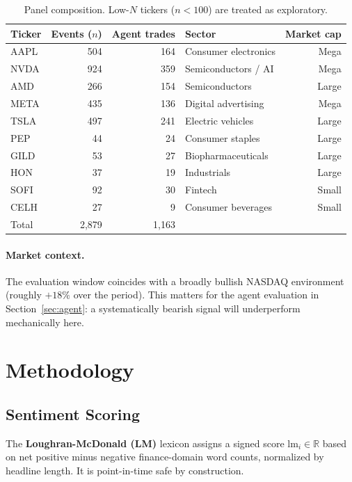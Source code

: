 \documentclass[11pt, letterpaper]{article}
\begin{document}
\begin{table}[h]
\centering
\small
\caption{Panel composition. Low-$N$ tickers ($n < 100$) are treated as exploratory.}
\label{tab:panel}
\begin{tabular}{lrrlr}
\toprule
Ticker & Events ($n$) & Agent trades & Sector & Market cap \\
\midrule
AAPL  & 504 & 164 & Consumer electronics & Mega \\
NVDA  & 924 & 359 & Semiconductors / AI  & Mega \\
AMD   & 266 & 154 & Semiconductors       & Large \\
META  & 435 & 136 & Digital advertising  & Mega \\
TSLA  & 497 & 241 & Electric vehicles    & Large \\
PEP   &  44 &  24 & Consumer staples     & Large \\
GILD  &  53 &  27 & Biopharmaceuticals   & Large \\
HON   &  37 &  19 & Industrials          & Large \\
SOFI  &  92 &  30 & Fintech              & Small \\
CELH  &  27 &   9 & Consumer beverages   & Small \\
\midrule
Total & 2,879 & 1,163 & & \\
\bottomrule
\end{tabular}
\end{table}

\paragraph{Market context.} The evaluation window coincides with a broadly bullish
NASDAQ environment (roughly $+18\%$ over the period). This matters for the agent
evaluation in Section~\ref{sec:agent}: a systematically bearish signal will
underperform mechanically here.

\section{Methodology}
\label{sec:method}

\subsection{Sentiment Scoring}

The \textbf{Loughran-McDonald (LM)} lexicon \citep{loughran2011liability} assigns a
signed score $\mathrm{lm}_i \in \mathbb{R}$ based on net positive minus negative
finance-domain word counts, normalized by headline length. It is point-in-time safe
by construction.
\end{document}
